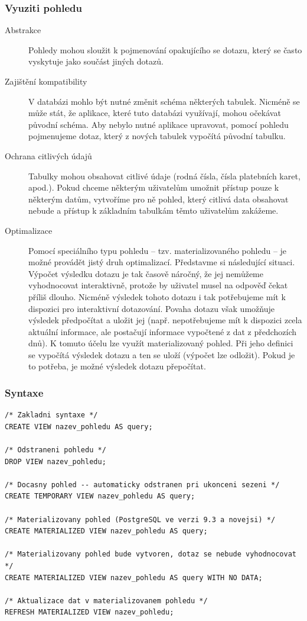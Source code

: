 \documentclass[10pt,a4paper]{article}
\begin{document}
\subsubsection{Vyuziti pohledu}
\begin{description}
	\item[Abstrakce]
Pohledy mohou sloužit k pojmenování opakujícího se dotazu, který se často vyskytuje jako součást jiných dotazů.
	\item[Zajištění kompatibility]
V databázi mohlo být nutné změnit schéma některých tabulek. Nicméně se může stát, že aplikace, které tuto databázi využívají, mohou očekávat původní schéma. Aby nebylo nutné aplikace upravovat, pomocí pohledu pojmenujeme dotaz, který z nových tabulek vypočítá původní tabulku.
	\item[Ochrana citlivých údajů]
Tabulky mohou obsahovat citlivé údaje (rodná čísla, čísla platebních karet, apod.). Pokud chceme některým uživatelům umožnit přístup pouze k některým datům, vytvoříme pro ně pohled, který citlivá data obsahovat nebude a přístup k základním tabulkám těmto uživatelům zakážeme.
	\item[Optimalizace]
Pomocí speciálního typu pohledu – tzv. materializovaného pohledu – je možné provádět jistý druh optimalizací. Představme si následující situaci. Výpočet výsledku dotazu je tak časově náročný, že jej nemůžeme vyhodnocovat interaktivně, protože by uživatel musel na odpověď čekat příliš dlouho. Nicméně výsledek tohoto dotazu i tak potřebujeme mít k dispozici pro interaktivní dotazování. Povaha dotazu však umožňuje výsledek předpočítat a uložit jej (např. nepotřebujeme mít k dispozici zcela aktuální informace, ale postačují informace vypočtené z dat z předchozích dnů). K tomuto účelu lze využít materializovaný pohled. Při jeho definici se vypočítá výsledek dotazu a ten se uloží (výpočet lze odložit). Pokud je to potřeba, je možné výsledek dotazu přepočítat.
\end{description}

\subsubsection{Syntaxe}
\begin{lstlisting}
/* Zakladni syntaxe */
CREATE VIEW nazev_pohledu AS query;

/* Odstraneni pohledu */
DROP VIEW nazev_pohledu;

/* Docasny pohled -- automaticky odstranen pri ukonceni sezeni */
CREATE TEMPORARY VIEW nazev_pohledu AS query;

/* Materializovany pohled (PostgreSQL ve verzi 9.3 a novejsi) */
CREATE MATERIALIZED VIEW nazev_pohledu AS query;

/* Materializovany pohled bude vytvoren, dotaz se nebude vyhodnocovat */
CREATE MATERIALIZED VIEW nazev_pohledu AS query WITH NO DATA;

/* Aktualizace dat v materializovanem pohledu */
REFRESH MATERIALIZED VIEW nazev_pohledu;
\end{lstlisting}
\end{document}
